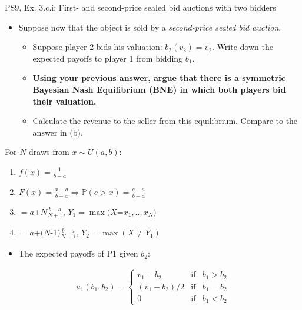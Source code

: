 \begin{frame}{PS9, Ex. 3.c.i: First- and second-price sealed bid auctions with two bidders}
    \begin{multicols}{2}
      \begin{itemize}
        \item[(c)] Suppose now that the object is sold by a \textit{second-price sealed bid auction}.
        \begin{itemize}\normalsize
          \item[i.]   Suppose player 2 bids his valuation: $b_2(v_2) = v_2$. Write down the expected payoffs to player 1 from bidding $b_1$.
          \item[ii.]  \textbf{Using your previous answer, argue that there is a symmetric Bayesian Nash Equilibrium (BNE) in which both players bid their valuation.}
          \item[iii.] Calculate the revenue to the seller from this equilibrium. Compare to the answer in (b).
        \end{itemize}
      \end{itemize}
      For $N$ draws from $x\sim U(a, b):$
      \vspace{-6pt}
      \begin{enumerate}
        \item[PDF:] $f(x)=\frac{1}{b-a}$
        \item[CDF:] $F(x)=\frac{x-a}{b-a}\Rightarrow\mathbb{P}(c>x)=\frac{c-a}{b-a}$
        \item[$\mathbb{E}(Y_1)$] $=a$+$N\frac{b-a}{N+1}$, $Y_1=\max(X$=$x_1,..,x_N)$
        \item[$\mathbb{E}(Y_2)$] $=a$+$(N$-1$)\frac{b-a}{N+1}$, $Y_2=\max(X\neq Y_1)$
      \end{enumerate}
      \vfill\null\columnbreak
      \begin{itemize}
        \item[(i)] The expected payoffs of P1 given $b_2$:
      \end{itemize}
      \vspace{-12pt}
      \begin{align*}
        u_1(b_1,b_2)=\left\{\begin{array}{lcl}
          v_1-b_2     & \text{if} & b_1>b_2 \\
          (v_1-b_2)/2 & \text{if} & b_1=b_2 \\
          0           & \text{if} & b_1<b_2
        \end{array}\right.
      \end{align*}
      \vfill\null
    \end{multicols}
\end{frame}


